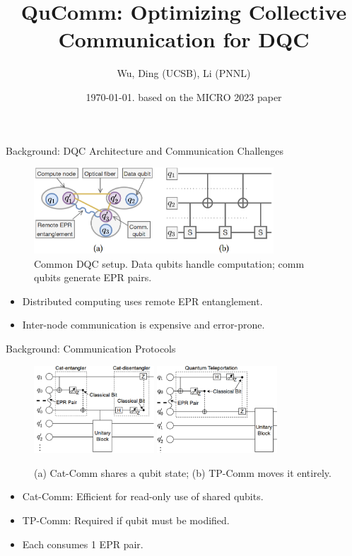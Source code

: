 \documentclass{beamer}
\title{QuComm: Optimizing Collective Communication for DQC}
\author{Wu, Ding (UCSB), Li (PNNL)}
\date{\today. based on the MICRO 2023 paper}
\begin{document}
	
	\frame{\titlepage}
	
	\begin{frame}{Background: DQC Architecture and Communication Challenges}
		\begin{figure}
			\includegraphics[width=0.8\textwidth]{figure/setup.png}
			\caption[short text]{Common DQC setup. Data qubits handle computation; comm qubits generate EPR pairs.}
		\end{figure}

		\begin{itemize}
			\item Distributed computing uses remote EPR entanglement.
			\item Inter-node communication is expensive and error-prone.
		\end{itemize}
	\end{frame}
	
	\begin{frame}{Background: Communication Protocols}
		\begin{figure}
			\includegraphics[width=0.4\textwidth]{figure/cat-comm.png}
			\hspace*{4pt}
			\includegraphics[width=0.4\textwidth]{figure/TP-comm.png}
			\caption{(a) Cat-Comm shares a qubit state; (b) TP-Comm moves it entirely.}
		\end{figure}
		
		\begin{itemize}
			\item Cat-Comm: Efficient for read-only use of shared qubits.
			\item TP-Comm: Required if qubit must be modified.
			\item Each consumes 1 EPR pair.
		\end{itemize}
	\end{frame}
	
\end{document}
